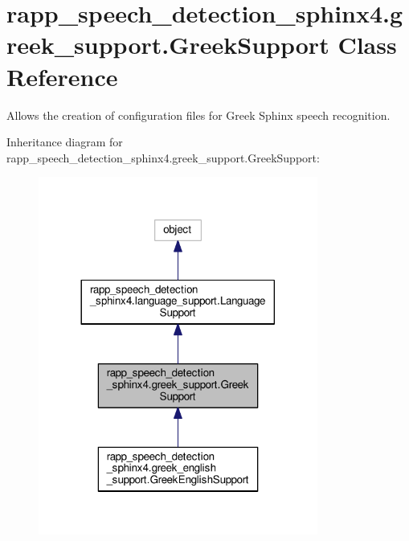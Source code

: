 \hypertarget{classrapp__speech__detection__sphinx4_1_1greek__support_1_1GreekSupport}{\section{rapp\-\_\-speech\-\_\-detection\-\_\-sphinx4.\-greek\-\_\-support.\-Greek\-Support Class Reference}
\label{classrapp__speech__detection__sphinx4_1_1greek__support_1_1GreekSupport}
}


Allows the creation of configuration files for Greek Sphinx speech recognition.  




Inheritance diagram for rapp\-\_\-speech\-\_\-detection\-\_\-sphinx4.\-greek\-\_\-support.\-Greek\-Support\-:
\nopagebreak
\begin{figure}[H]
\begin{center}
\leavevmode
\includegraphics[width=260pt]{classrapp__speech__detection__sphinx4_1_1greek__support_1_1GreekSupport__inherit__graph}
\end{center}
\end{figure}


